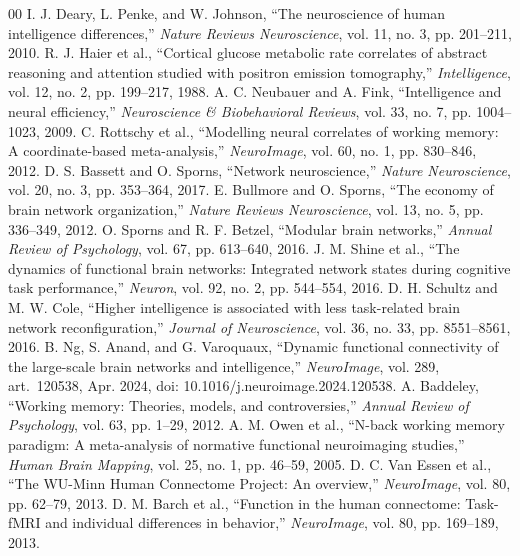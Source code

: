 \documentclass[conference]{IEEEtran}
\begin{document}
\begin{thebibliography}{00}
 I. J. Deary, L. Penke, and W. Johnson, ``The neuroscience of human intelligence differences,'' \textit{Nature Reviews Neuroscience}, vol. 11, no. 3, pp. 201--211, 2010.
 R. J. Haier et al., ``Cortical glucose metabolic rate correlates of abstract reasoning and attention studied with positron emission tomography,'' \textit{Intelligence}, vol. 12, no. 2, pp. 199--217, 1988.
 A. C. Neubauer and A. Fink, ``Intelligence and neural efficiency,'' \textit{Neuroscience \& Biobehavioral Reviews}, vol. 33, no. 7, pp. 1004--1023, 2009.
 C. Rottschy et al., ``Modelling neural correlates of working memory: A coordinate-based meta-analysis,'' \textit{NeuroImage}, vol. 60, no. 1, pp. 830--846, 2012.
 D. S. Bassett and O. Sporns, ``Network neuroscience,'' \textit{Nature Neuroscience}, vol. 20, no. 3, pp. 353--364, 2017.
 E. Bullmore and O. Sporns, ``The economy of brain network organization,'' \textit{Nature Reviews Neuroscience}, vol. 13, no. 5, pp. 336--349, 2012.
 O. Sporns and R. F. Betzel, ``Modular brain networks,'' \textit{Annual Review of Psychology}, vol. 67, pp. 613--640, 2016.
 J. M. Shine et al., ``The dynamics of functional brain networks: Integrated network states during cognitive task performance,'' \textit{Neuron}, vol. 92, no. 2, pp. 544--554, 2016.
 D. H. Schultz and M. W. Cole, ``Higher intelligence is associated with less task-related brain network reconfiguration,'' \textit{Journal of Neuroscience}, vol. 36, no. 33, pp. 8551--8561, 2016.
 B. Ng, S. Anand, and G. Varoquaux, ``Dynamic functional connectivity of the large-scale brain networks and intelligence,'' \textit{NeuroImage}, vol. 289, art.\ 120538, Apr. 2024, doi: 10.1016/j.neuroimage.2024.120538.
 A. Baddeley, ``Working memory: Theories, models, and controversies,'' \textit{Annual Review of Psychology}, vol. 63, pp. 1--29, 2012.
 A. M. Owen et al., ``N-back working memory paradigm: A meta-analysis of normative functional neuroimaging studies,'' \textit{Human Brain Mapping}, vol. 25, no. 1, pp. 46--59, 2005.
 D. C. Van Essen et al., ``The WU-Minn Human Connectome Project: An overview,'' \textit{NeuroImage}, vol. 80, pp. 62--79, 2013.
 D. M. Barch et al., ``Function in the human connectome: Task-fMRI and individual differences in behavior,'' \textit{NeuroImage}, vol. 80, pp. 169--189, 2013.

\end{thebibliography}
\end{document}
